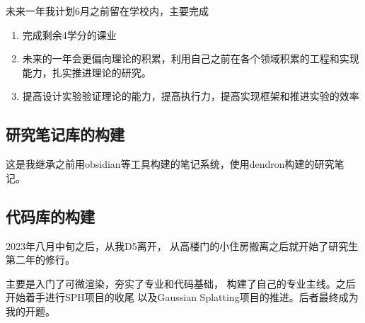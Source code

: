 未来一年我计划6月之前留在学校内，主要完成
\begin{enumerate}
    \item 完成剩余4学分的课业
    \item 未来的一年会更偏向理论的积累，利用自己之前在各个领域积累的工程和实现能力，扎实推进理论的研究。
    \item 提高设计实验验证理论的能力，提高执行力，提高实现框架和推进实验的效率
\end{enumerate}

\subsection{研究笔记库的构建}

这是我继承之前用obsidian等工具构建的笔记系统，使用dendron构建的研究笔记。



\subsection{代码库的构建}



2023年八月中旬之后，从我D5离开，
从高楼门的小住房搬离之后就开始了研究生第二年的修行。

主要是入门了可微渲染，夯实了专业和代码基础，
构建了自己的专业主线。之后开始着手进行SPH项目的收尾
以及Gaussian Splatting项目的推进。后者最终成为我的开题。
